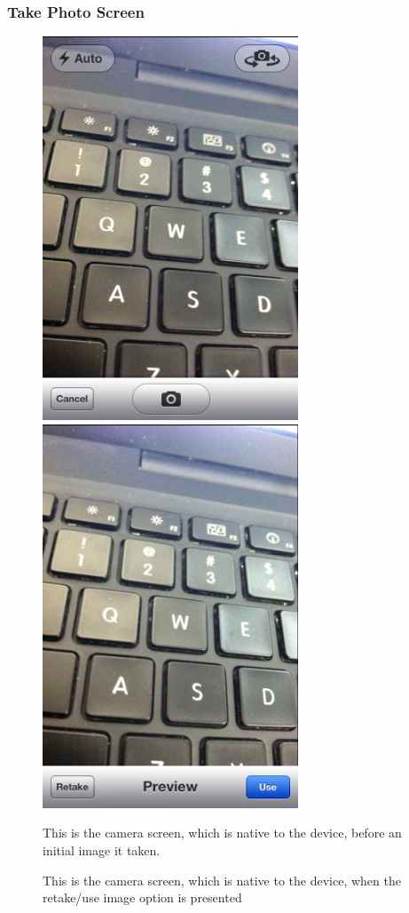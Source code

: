 \newpage
\subsubsection{Take Photo Screen}
\begin{figure}[H!htb]
\includegraphics[width=3in]{ScreenShots111011/TakePhoto.png}
\includegraphics[width=3in]{ScreenShots111011/RetakePhoto.png}
\begin{minipage}{0.5\linewidth}
\caption{This is the camera screen, which is native to the device, before an initial image it taken.}
\end{minipage}
\begin{minipage}{0.5\linewidth}
\caption{This is the camera screen, which is native to the device, when the retake/use image option is presented}
\end{minipage}
\end{figure}

